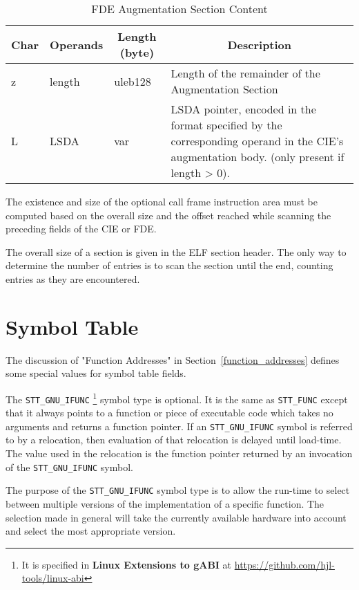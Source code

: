 \begin{table}[H]
\Hrule
\caption{FDE Augmentation Section Content}
\label{format-fdeaug}
\begin{center}
\begin{tabular}{l|p{5em}|l|p{15em}}
  \multicolumn{1}{c}{Char}
         & \multicolumn{1}{c}{Operands}
         & \multicolumn{1}{c}{Length (byte)}
         & \multicolumn{1}{c}{Description} \\ \hline
  z & length & uleb128 & Length of the remainder of the
                                        Augmentation Section \\
  L & LSDA & var & LSDA pointer, encoded in the
                   format specified by the
                   corresponding operand in the CIE's
                   augmentation body. (only present if length > 0). \\
\hline
    \end{tabular}
  \end{center}
\Hrule
\end{table}
The existence and size of the optional call frame instruction area must
be computed
based on the overall size and the offset reached while scanning the
preceding fields of the CIE or FDE.

The overall size of a  section is given in the ELF section
header.  The only way to determine the number of entries is to scan
the section until the end, counting entries as they are encountered.

\section{Symbol Table}

The discussion of "Function Addresses" in Section~\ref{function_addresses}
defines some special values for symbol table fields.

The \texttt{STT_GNU_IFUNC}
\footnote{It is specified in {\bf Linux Extensions to gABI}
at \url{https://github.com/hjl-tools/linux-abi}}
symbol type is optional. It is the same as
\texttt{STT_FUNC} except that it always points to a function or piece of
executable code which takes no arguments and returns a function pointer.
If an \texttt{STT_GNU_IFUNC} symbol is referred to by a relocation, then
evaluation of that relocation is delayed until load-time.  The value
used in the relocation is the function pointer returned by an invocation
of the \texttt{STT_GNU_IFUNC} symbol.
 
The purpose of the \texttt{STT_GNU_IFUNC} symbol type is to allow the
run-time to select between multiple versions of the implementation of
a specific function.  The selection made in general will take the
currently available hardware into account and select the most
appropriate version.

